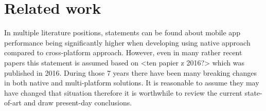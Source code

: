 
\section{Related work}

In multiple literature positions, statements can be found about mobile app performance being significantly higher when developing using native approach compared to cross-platform approach. However, even in many rather recent papers this statement is assumed based on <ten papier z 2016?> which was published in 2016. During those 7 years there have been many breaking changes in both native and multi-platform solutions. It is reasonable to assume they may have changed that situation therefore it is worthwhile to review the current state-of-art and draw present-day conclusions.
